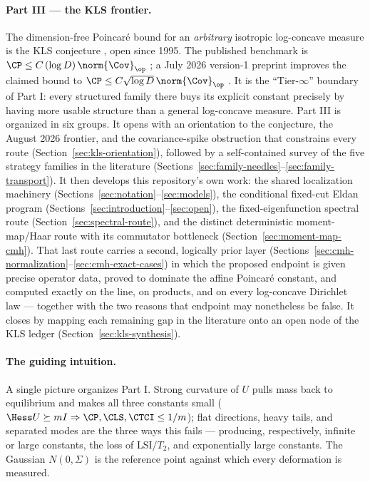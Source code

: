 \documentclass[../main.tex]{subfiles}
\begin{document}
\paragraph{Part III --- the KLS frontier.}
The dimension-free Poincar\'e bound for an \emph{arbitrary} isotropic log-concave measure is the KLS
conjecture \cite{KannanLovaszSimonovits1995,LeeVempala2018}, open since 1995. The published
benchmark is $\CP\le C\,(\log D)\,\norm{\Cov}_\op$ \cite{Klartag2023Logarithmic}; a July
2026 version-1 preprint improves the claimed bound to
$\CP\le C\sqrt{\log D}\,\norm{\Cov}_\op$ \cite{Letwin2026QuadraticKLS}. It is the ``Tier-$\infty$''
boundary of Part I: every structured family there buys its explicit constant precisely by having
more usable structure than a general log-concave measure. Part III is organized in six groups. It
opens with an orientation to the conjecture, the August 2026 frontier, and the covariance-spike
obstruction that constrains every route (Section~\ref{sec:kls-orientation}), followed by a
self-contained survey of the five strategy families in the literature
(Sections~\ref{sec:family-needles}--\ref{sec:family-transport}). It then develops this
repository's own work: the shared localization machinery
(Sections~\ref{sec:notation}--\ref{sec:models}), the conditional fixed-cut Eldan program
(Sections~\ref{sec:introduction}--\ref{sec:open}), the fixed-eigenfunction spectral route
(Section~\ref{sec:spectral-route}), and the distinct deterministic moment-map/Haar route with its
commutator bottleneck (Section~\ref{sec:moment-map-cmh}). That last route carries a second,
logically prior layer (Sections~\ref{sec:cmh-normalization}--\ref{sec:cmh-exact-cases}) in which
the proposed endpoint is given precise operator data, proved to dominate the affine Poincar\'e
constant, and computed exactly on the line, on products, and on every log-concave Dirichlet law
--- together with the two reasons that endpoint may nonetheless be false. It closes by mapping each remaining gap
in the literature onto an open node of the KLS ledger (Section~\ref{sec:kls-synthesis}).

\paragraph{The guiding intuition.}
A single picture organizes Part I. Strong curvature of $U$ pulls mass back to equilibrium
and makes all three constants small ($\Hess U\succeq mI\Rightarrow\CP,\CLS,\CTCI\le 1/m$);
flat directions, heavy tails, and separated modes are the three ways this fails ---
producing, respectively, infinite or large constants, the loss of LSI/$T_2$, and
exponentially large constants. The Gaussian $N(0,\Sigma)$ is the reference point against
which every deformation is measured.
\end{document}
